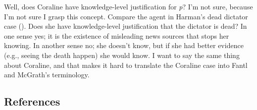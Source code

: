 \documentclass[
  10pt,
  letterpaper,
  DIV=11,
  numbers=noendperiod,
  twoside]{scrartcl}
\begin{document}
Well, does Coraline have knowledge-level justification for \emph{p}? I'm
not sure, because I'm not sure I grasp this concept. Compare the agent
in Harman's dead dictator case (). Does she have knowledge-level justification that the dictator is
dead? In one sense yes; it is the existence of misleading news sources
that stops her knowing. In another sense no; she doesn't know, but if
she had better evidence (e.g., seeing the death happen) she would know.
I want to say the same thing about Coraline, and that makes it hard to
translate the Coraline case into Fantl and McGrath's terminology.

\subsection*{References}\label{references}
\end{document}

